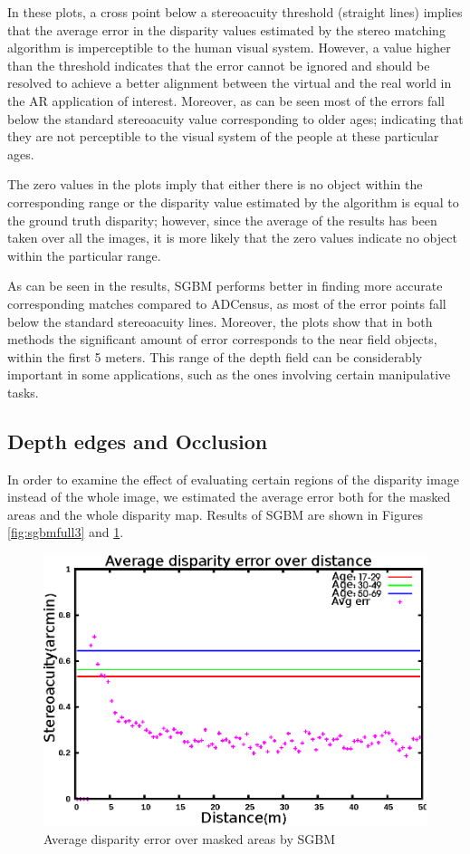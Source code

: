 In these plots, a cross point below a stereoacuity threshold (straight lines) implies that the average error in the disparity values estimated 
by the stereo matching 
algorithm is imperceptible to the human visual system. However, a value higher than the threshold indicates that
the error cannot be ignored and should be resolved to achieve a better alignment between the virtual and the 
real world in the AR application of interest. Moreover, as can be seen most of the errors
fall below the standard stereoacuity value corresponding to older ages; indicating that they are not perceptible to the visual system of the people at these 
particular ages.

The zero values in the plots imply that either there is no object within the corresponding range or the disparity value estimated by the algorithm
is equal to the ground truth disparity; however, since the average of the results has been taken over all the images, it is more likely that 
the zero values indicate no object within the particular range.

As can be seen in the results, SGBM performs better in finding more accurate corresponding matches 
compared to ADCensus, as most of the error points fall below the standard stereoacuity lines. Moreover, the plots show that in both methods 
the significant amount of error
corresponds to the near field objects, within the first 5 meters. This range of the depth field can be considerably important in some applications,
such as the ones involving certain manipulative tasks.

\subsection{Depth edges and Occlusion}
In order to examine the effect of evaluating certain regions of the disparity image instead of the whole image, 
we estimated the average error both for the masked areas and the whole disparity map. 
Results of SGBM are shown in Figures \ref{fig:sgbmfull3} and \ref{fig:sgbmmsk3}.

\begin{figure}[H]
\centering
\includegraphics[scale=0.8]{sgbmmsk3}
\caption{Average disparity error over masked areas by SGBM}
\label{fig:sgbmmsk3}
\end{figure} 


